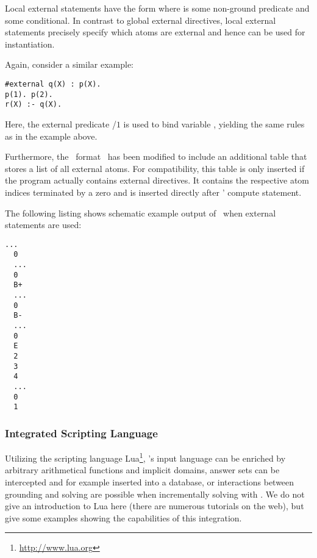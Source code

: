 Local external statements have the form  where
 is some non-ground predicate and  some conditional.
In contrast to global external directives, local external statements precisely specify 
which atoms are external and hence can be used for instantiation.
\begin{example}
Again, consider a similar example:
\begin{lstlisting}[numbers=none]
#external q(X) : p(X).
p(1). p(2).
r(X) :- q(X).
\end{lstlisting}
Here, the external predicate /$1$ is used to bind variable , 
yielding the same rules as in the example above.
\eexample
\end{example}

Furthermore, the \smodels\ format~\cite{lparseManual} has been modified to include an additional table 
that stores a list  of all external atoms. For compatibility, this table is only inserted if the 
program actually contains external directives. It contains the respective atom indices terminated
by a zero and is inserted directly after \smodels' compute statement.
\begin{example}
The following listing shows schematic example output of \gringo\ when external statements are used:
\begin{lstlisting}[numbers=none]
  ...
  0
  ...
  0
  B+
  ...
  0
  B-
  ...
  0
  E
  2
  3
  4
  ...
  0
  1
\end{lstlisting}
\eexample
\end{example}

\subsubsection{Integrated Scripting Language}\label{subsec:lang:lua}
%
Utilizing the scripting language Lua\footnote{\url{http://www.lua.org}}, 
\gringo's input language can be enriched by arbitrary arithmetical functions and implicit domains,
answer sets can be intercepted and for example inserted into a database, or
interactions between grounding and solving are possible when incrementally solving with \clingo.
We do not give an introduction to Lua here (there are numerous tutorials on the web), 
but give some examples showing the capabilities of this integration.

